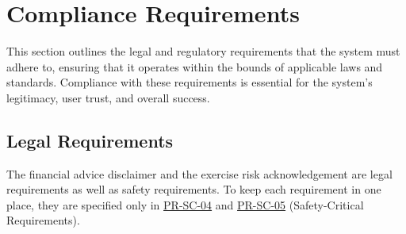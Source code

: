\documentclass[12pt]{article}
\begin{document}
\section{Compliance Requirements}

This section outlines the legal and regulatory requirements that the system must adhere to, ensuring that it operates within the bounds of applicable laws and standards. Compliance with these requirements is essential for the system's legitimacy, user trust, and overall success.

\subsection{Legal Requirements}

The financial advice disclaimer and the exercise risk acknowledgement are legal
requirements as well as safety requirements. To keep each requirement in one
place, they are specified only in \hyperlink{req:PR-SC-04}{PR-SC-04} and \hyperlink{req:PR-SC-05}{PR-SC-05} (Safety-Critical
Requirements).
\end{document}
